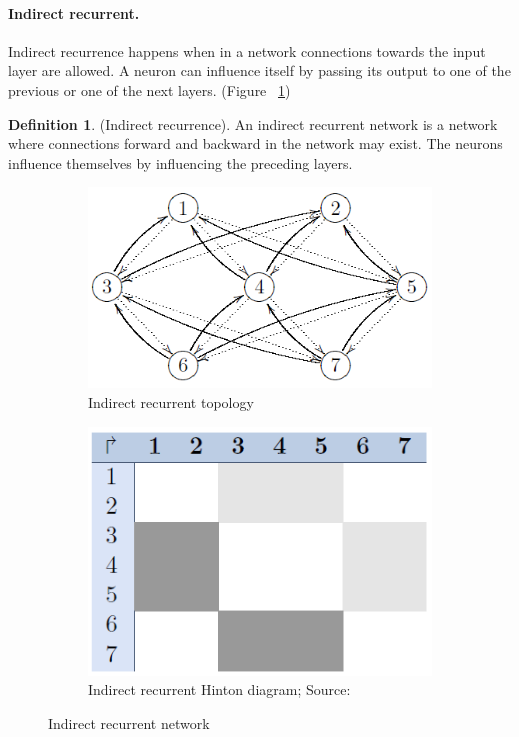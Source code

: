 \documentclass[pdftex,a4paper,12pt,twoside]{report}
\theoremstyle{plain} \newtheorem{theorem}{Theorem} \newtheorem{proposition}{Proposition} \newtheorem{lemma}{Lemma} \newtheorem*{corollary}{Corollary}
\theoremstyle{definition} \newtheorem{definition}{Definition} \newtheorem{conjecture}{Conjecture} \newtheorem*{example}{Example} \newtheorem{algorithm}{Algorithm}
\theoremstyle{remark} \newtheorem*{remark}{Remark} \newtheorem*{note}{Note} \newtheorem{case}{Case}
\begin{document}
\paragraph{Indirect recurrent.}
Indirect recurrence happens when in a network connections towards the input layer are allowed. A neuron can influence itself by passing its output to one of the previous or one of the next layers. (Figure ~\ref{fig:inderectrecurrence})
\begin{definition}
(Indirect recurrence). An indirect recurrent network is a network where connections forward and backward in the network may exist. The neurons influence themselves by influencing the preceding layers.
\end{definition}
\begin{figure}
\centering
	\begin{subfigure}[b]{0.49\textwidth}
	\centering
	\includegraphics[width=\textwidth]{./img/recurrent-indirect-Topology.png}
	\caption{Indirect recurrent topology}
	\end{subfigure}
	\begin{subfigure}[b]{0.49\textwidth}
	\centering
	\includegraphics[width=\textwidth]{./img/recurrent-indirect-Hinton.png}
	\caption{Indirect recurrent Hinton diagram; Source:\citep{Kriesel2013}}
	\end{subfigure}
\caption{Indirect recurrent network}
\label{fig:inderectrecurrence}
\end{figure}
\end{document}
